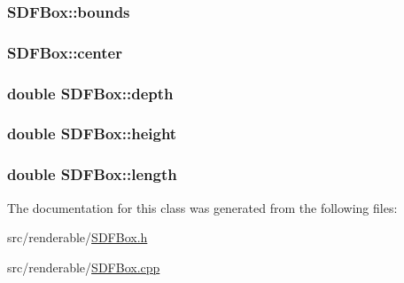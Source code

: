 \subsubsection[{\texorpdfstring{bounds}{bounds}}]{ S\+D\+F\+Box\+::bounds\hspace{0.3cm}{\ttfamily [private]}}\hypertarget{classSDFBox_a3cb36bcbfc2b009bec6d2880ac3e93f0}{}\label{classSDFBox_a3cb36bcbfc2b009bec6d2880ac3e93f0}
\subsubsection[{\texorpdfstring{center}{center}}]{ S\+D\+F\+Box\+::center\hspace{0.3cm}{\ttfamily [private]}}\hypertarget{classSDFBox_ab3c5b09a3c42843c995e28c3ee766c01}{}\label{classSDFBox_ab3c5b09a3c42843c995e28c3ee766c01}
\subsubsection[{\texorpdfstring{depth}{depth}}]{\setlength{\rightskip}{0pt plus 5cm}double S\+D\+F\+Box\+::depth\hspace{0.3cm}{\ttfamily [private]}}\hypertarget{classSDFBox_a2e6708728c6bcadde76fdec645759ec7}{}\label{classSDFBox_a2e6708728c6bcadde76fdec645759ec7}
\subsubsection[{\texorpdfstring{height}{height}}]{\setlength{\rightskip}{0pt plus 5cm}double S\+D\+F\+Box\+::height\hspace{0.3cm}{\ttfamily [private]}}\hypertarget{classSDFBox_a4be5004a92e2e6af1391287d46539a90}{}\label{classSDFBox_a4be5004a92e2e6af1391287d46539a90}
\subsubsection[{\texorpdfstring{length}{length}}]{\setlength{\rightskip}{0pt plus 5cm}double S\+D\+F\+Box\+::length\hspace{0.3cm}{\ttfamily [private]}}\hypertarget{classSDFBox_a4e1fe9cab3361dcb2e57e5c639d1d56d}{}\label{classSDFBox_a4e1fe9cab3361dcb2e57e5c639d1d56d}


The documentation for this class was generated from the following files\+:\begin{DoxyCompactItemize}
\item 
src/renderable/\hyperlink{SDFBox_8h}{S\+D\+F\+Box.\+h}\item 
src/renderable/\hyperlink{SDFBox_8cpp}{S\+D\+F\+Box.\+cpp}\end{DoxyCompactItemize}
